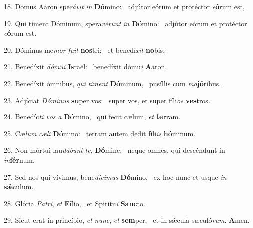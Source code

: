 18. Domus Aaron spe\textit{rá}\textit{vit} \textit{in} \textbf{Dó}mino: \ast\  adjútor eórum et protéctor \textit{e}\textbf{ó}rum est,\

19. Qui timent Dóminum, spera\textit{vé}\textit{runt} \textit{in} \textbf{Dó}mino: \ast\  adjútor eórum et protéctor \textit{e}\textbf{ó}rum est.\

20. Dóminus me\textit{mor} \textit{fu}\textit{it} \textbf{nos}tri: \ast\  et benedí\textit{xit} \textbf{no}bis:\

21. Benedíxit \textit{dó}\textit{mu}\textit{i} \textbf{Is}raël: \ast\  benedíxit dómu\textit{i} \textbf{A}aron.\

22. Benedíxit ómnibus, \textit{qui} \textit{ti}\textit{ment} \textbf{Dó}minum, \ast\  pusíllis cum \textit{ma}\textbf{jó}ribus.\

23. Adjíciat \textit{Dó}\textit{mi}\textit{nus} \textbf{su}per vos: \ast\  super vos, et super fíli\textit{os} \textbf{ves}tros.\

24. Benedíc\textit{ti} \textit{vos} \textit{a} \textbf{Dó}mino, \ast\  qui fecit cælum, \textit{et} \textbf{ter}ram.\

25. Cæ\textit{lum} \textit{cæ}\textit{li} \textbf{Dó}mino: \ast\  terram autem dedit fíli\textit{is} \textbf{hó}minum.\

26. Non mórtui lau\textit{dá}\textit{bunt} \textit{te}, \textbf{Dó}mine: \ast\  neque omnes, qui descéndunt in \textit{in}\textbf{fér}num.\

27. Sed nos qui vívimus, bene\textit{dí}\textit{ci}\textit{mus} \textbf{Dó}mino, \ast\  ex hoc nunc et usque \textit{in} \textbf{sǽ}culum.\

28. Glória \textit{Pa}\textit{tri}, \textit{et} \textbf{Fí}lio, \ast\  et Spirítu\textit{i} \textbf{Sanc}to.\

29. Sicut erat in princípio, \textit{et} \textit{nunc}, \textit{et} \textbf{sem}per, \ast\  et in sǽcula sæculó\textit{rum}. \textbf{A}men.\

